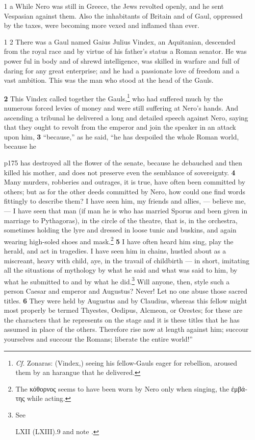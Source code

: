 1 a While Nero was still in Greece, the Jews revolted openly, and he sent Vespasian against them. Also the inhabitants of Britain and of Gaul, oppressed by the taxes, were becoming more vexed and inflamed than ever.

1 2 There was a Gaul named Gaius Julius Vindex, an Aquitanian, descended from the royal race and by virtue of his father's status a Roman senator. He was power ­ful in body and of shrewd intelligence, was skilled in warfare and full of daring for any great enterprise; and he had a passionate love of freedom and a vast ambition. This was the man who stood at the head of the Gauls.

\textbf{2} This Vindex called together the Gauls,\texthebrew{⁠}\footnote{\emph{Cf.} Zonaras: (Vindex,) seeing his fellow-Gauls eager for rebellion, aroused them by an harangue that he delivered.

} who had suffered much by the numerous forced levies of money and were still suffering at Nero's hands. And ascending a tribunal he delivered a long and detailed speech against Nero, saying that they ought to revolt from the emperor and join the speaker in an attack upon him, \textbf{3} ``because,'' as he said, ``he has despoiled the whole Roman world, because he

p175 has destroyed all the flower of the senate, because he debauched and then killed his mother, and does not preserve even the semblance of sovereignty. \textbf{4} Many murders, robberies and outrages, it is true, have often been committed by others; but as for the other deeds committed by Nero, how could one find words fittingly to describe them? I have seen him, my friends and allies, \texthebrew{—} believe me, \texthebrew{—} I have seen that man (if man he is who has married Sporus and been given in marriage to Pythagoras), in the circle of the theatre, that is, in the orchestra, sometimes holding the lyre and dressed in loose tunic and buskins, and again wearing high-soled shoes and mask.\texthebrew{⁠}\footnote{The \textgreek{κόθορνος} seems to have been worn by Nero only when singing, the \textgreek{\texthebrew{ἐ}μβάτης} while acting.

} \textbf{5} I have often heard him sing, play the herald, and act in tragedies. I have seen him in chains, hustled about as a miscreant, heavy with child, aye, in the travail of childbirth \texthebrew{—} in short, imitating all the situations of mythology by what he said and what was said to him, by what he submitted to and by what he did.\texthebrew{⁠}\footnote{See

LXII (LXIII).9 and note .

} Will anyone, then, style such a person Caesar and emperor and Augustus? Never! Let no one abuse those sacred titles. \textbf{6} They were held by Augustus and by Claudius, whereas this fellow might most properly be termed Thyestes, Oedipus, Alcmeon, or Orestes; for these are the characters that he represents on the stage and it is these titles that he has assumed in place of the others. Therefore rise now at length against him; succour yourselves and succour the Romans; liberate the entire world!''

